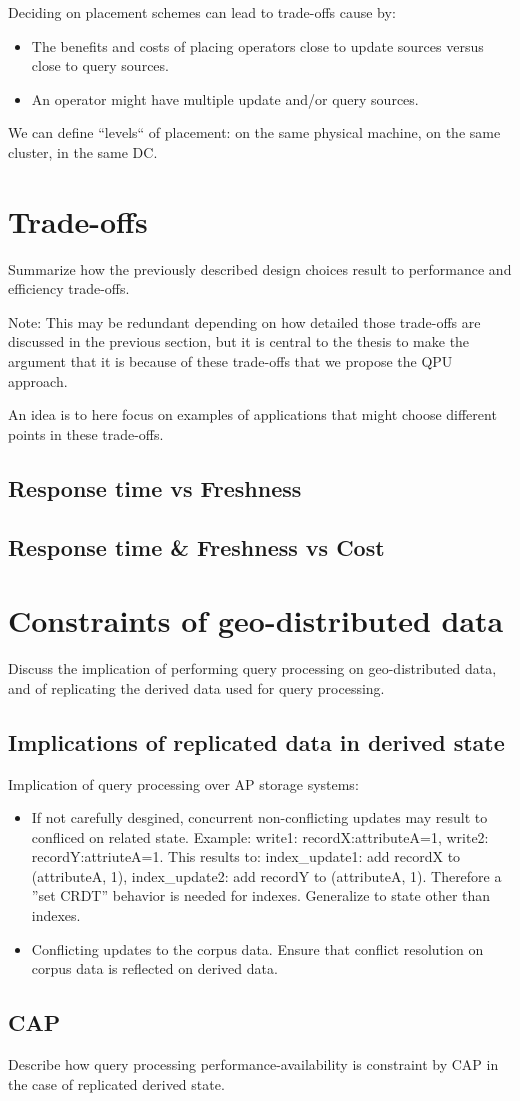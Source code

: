 Deciding on placement schemes can lead to trade-offs cause by:
\begin{itemize}
  \item The benefits and costs of placing operators close to update sources
  versus close to query sources.
  \item An operator might have multiple update and/or query sources.
\end{itemize}

We can define ``levels`` of placement: on the same physical machine, on the same
cluster, in the same DC.

\section{Trade-offs}
Summarize how the previously described design choices result to performance and
efficiency trade-offs.

Note: This may be redundant depending on how detailed those trade-offs are
discussed in the previous section, but it is central to the thesis to make the
argument that it is because of these trade-offs that we propose the QPU
approach.

An idea is to here focus on examples of applications that might choose different
points in these trade-offs.

\subsection{Response time vs Freshness}

\subsection{Response time \& Freshness vs Cost}


\section{Constraints of geo-distributed data}
Discuss the implication of performing query processing on geo-distributed data,
and of replicating the derived data used for query processing.

\subsection{Implications of replicated data in derived state}
Implication of query processing over AP storage systems:
\begin{itemize}
  \item If not carefully desgined, concurrent non-conflicting updates may
  result to confliced on related state.
  Example: write1: recordX:attributeA=1, write2: recordY:attriuteA=1.
  This results to: index\_update1: add recordX to (attributeA, 1),
  index\_update2: add recordY to (attributeA, 1).
  Therefore a ''set CRDT'' behavior is needed for indexes.
  Generalize to state other than indexes.
  \item Conflicting updates to the corpus data.
  Ensure that conflict resolution on corpus data is reflected on derived data.
\end{itemize}

\subsection{CAP}
Describe how query processing performance-availability is constraint by
CAP in the case of replicated derived state.